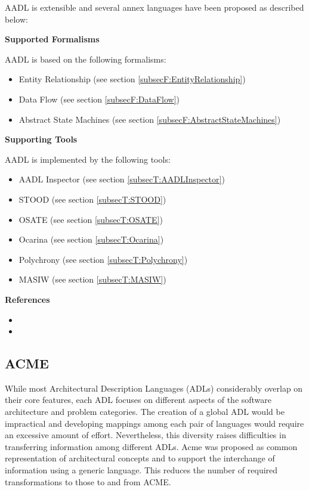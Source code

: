 AADL is extensible and several annex languages have been proposed as described below:

\textbf{Supported Formalisms}

AADL is based on the following formalisms:
\begin{itemize}
	\item Entity Relationship (see section \ref{subsecF:EntityRelationship})
	\item Data Flow (see section \ref{subsecF:DataFlow})
	\item Abstract State Machines (see section \ref{subsecF:AbstractStateMachines})
\end{itemize}


\textbf{Supporting Tools}

AADL is implemented by the following tools:
\begin{itemize}
	\item AADL Inspector (see section \ref{subsecT:AADLInspector})
	\item STOOD (see section \ref{subsecT:STOOD})
	\item OSATE (see section \ref{subsecT:OSATE})
	\item Ocarina (see section \ref{subsecT:Ocarina})
	\item Polychrony (see section \ref{subsecT:Polychrony})
	\item MASIW (see section \ref{subsecT:MASIW})
\end{itemize}


\textbf{References}
\begin{itemize}
	
\item {}
	
\item {}
\end{itemize}



\subsection{ACME}
\label{subsecL:ACME}


While most Architectural Description Languages (ADLs) considerably overlap on their core features, each ADL focuses on different aspects of the software architecture and problem categories. The creation of a global ADL would be impractical and developing mappings among each pair of languages would require an excessive amount of effort. Nevertheless, this diversity raises difficulties in transferring information among different ADLs. Acme was proposed as common representation of architectural concepts and to support the interchange of information using a generic language. This reduces the number of required transformations to those to and from ACME.

